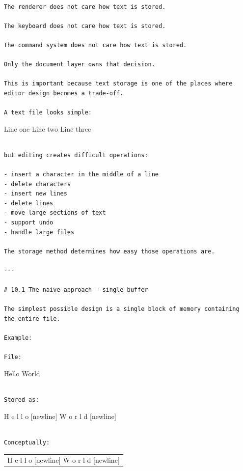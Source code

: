 \documentclass[
  oneside,
  openany]{book}
\begin{document}
\begin{verbatim}

The renderer does not care how text is stored.

The keyboard does not care how text is stored.

The command system does not care how text is stored.

Only the document layer owns that decision.

This is important because text storage is one of the places where editor design becomes a trade-off.

A text file looks simple:
\end{verbatim}

Line one Line two Line three

\begin{verbatim}

but editing creates difficult operations:

- insert a character in the middle of a line
- delete characters
- insert new lines
- delete lines
- move large sections of text
- support undo
- handle large files

The storage method determines how easy those operations are.

---

# 10.1 The naive approach — single buffer

The simplest possible design is a single block of memory containing the entire file.

Example:

File:
\end{verbatim}

Hello World

\begin{verbatim}

Stored as:
\end{verbatim}

H e l l o {[}newline{]} W o r l d {[}newline{]}

\begin{verbatim}

Conceptually:
\end{verbatim}

\begin{longtable}[]{@{}
  >{\raggedright\arraybackslash}p{}@{}}
\toprule\noalign{}
\endhead
\bottomrule\noalign{}
\endlastfoot
H e l l o {[}newline{]} W o r l d {[}newline{]} \\
\end{longtable}
\end{document}
